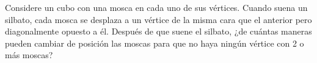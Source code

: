 Considere un cubo con una mosca en cada uno de sus vértices. Cuando suena un silbato, cada mosca se desplaza a un vértice de la misma cara que el anterior pero diagonalmente opuesto a él. Después de que suene el silbato, ¿de cuántas maneras pueden cambiar de posición las moscas para que no haya ningún vértice con 2 o más moscas?

